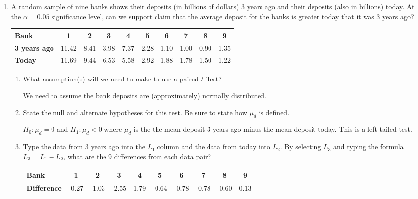 \begin{enumerate}
\item A random sample of nine banks shows their deposits (in billions of dollars) 3 years ago and their deposits (also in billions) today. At the $\alpha = 0.05$ significance level, can we support claim that the average deposit for the banks is greater today that it was 3 years ago?
    \begin{center}
    \begin{tabular}{|l|c|c|c|c|c|c|c|c|c|}
    \hline
    \textbf{Bank}   & 1 & 2 & 3 & 4 & 5 & 6 & 7 & 8 & 9  \\
    \hline
    \textbf{3 years ago} & 11.42 & 8.41 & 3.98 & 7.37 & 2.28 & 1.10 & 1.00 & 0.90 & 1.35 \\
    \hline
    \textbf{Today}       & 11.69 & 9.44 & 6.53 & 5.58 & 2.92 & 1.88 & 1.78 & 1.50 & 1.22 \\
    \hline
    \end{tabular}
    \end{center}
    
    \begin{enumerate}
        
        \item What assumption(s) will we need to make to use a paired $t$-Test?
        
        {\answer We need to assume the bank deposits are (approximately) normally distributed.}
        
        \vfill
        
        \item State the null and alternate hypotheses for this test. Be sure to state how $\mu_d$ is defined.
        
        {\answer $H_0 : \mu_d = 0$  and	$H_1: \mu_d < 0$ where $\mu_d$ is the the mean deposit 3 years ago minus the mean deposit today. This is a left-tailed test.}
        
        \vfill
        
        \item Type the data from 3 years ago into the $L_1$ column and the data from today into $L_2$. By selecting $L_3$ and typing the formula $L_3 = L_1 - L_2$, what are the 9 differences from each data pair?
        
        {\answer    \begin{tabular}{|l|c|c|c|c|c|c|c|c|c|}
                    \textbf{Bank}   & 1 & 2 & 3 & 4 & 5 & 6 & 7 & 8 & 9   \\
                    \hline
                    \textbf{Difference} & -0.27 & -1.03 & -2.55 & 1.79 & -0.64 & -0.78 & -0.78 & -0.60 & 0.13 \\
                    \end{tabular} }
        

\end{enumerate}
\end{enumerate}
